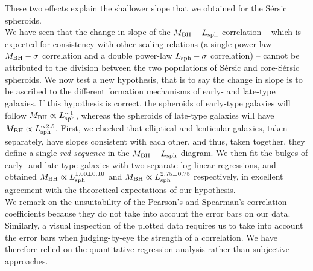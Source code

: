 \documentclass[preprint2]{emulateapj}
\begin{document}
These two effects explain the shallower slope that we obtained for the S\'ersic spheroids. \\
We have seen that the change in slope of the $M_{\rm BH} - L_{\rm sph}$ correlation -- 
which is expected for consistency with other scaling relations 
(a single power-law $M_{\rm BH} - \sigma$ correlation and a double power-law $L_{\rm sph} - \sigma$ correlation) -- 
cannot be attributed to the division between the two populations of S\'ersic and core-S\'ersic spheroids.
We now test a new hypothesis, that is to say the change in slope is to be ascribed to the different formation mechanisms of early- and late-type galaxies. 
If this hypothesis is correct, 
the spheroids of early-type galaxies will follow $M_{\rm BH} \propto L_{\rm sph}^{\sim 1}$, 
whereas the spheroids of late-type galaxies will have $M_{\rm BH} \propto L_{\rm sph}^{\sim 2.5}$.
First, we checked that elliptical and lenticular galaxies, taken separately, have slopes consistent with each other, 
and thus, taken together, they define a single \emph{red sequence} in the $M_{\rm BH} - L_{\rm sph}$ diagram. 
We then fit the bulges of early- and late-type galaxies with two separate log-linear regressions, 
and obtained $M_{\rm BH} \propto L_{\rm sph}^{1.00 \pm 0.10}$ and $M_{\rm BH} \propto L_{\rm sph}^{2.75 \pm 0.75}$ respectively, 
in excellent agreement with the theoretical expectations of our hypothesis. \\
We remark on the unsuitability of the Pearson's and Spearman's correlation coefficients because 
they do not take into account the error bars on our data.
Similarly, a visual inspection of the plotted data requires us to take into account the error bars 
when judging-by-eye the strength of a correlation. 
We have therefore relied on the quantitative regression analysis rather than subjective approaches.
\end{document}
